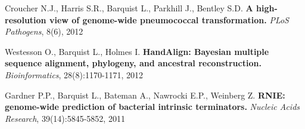 \item{Croucher N.J., Harris S.R., Barquist L., Parkhill J., Bentley S.D. \textbf{A high-resolution view of genome-wide pneumococcal transformation.} \textit{PLoS Pathogens}, 8(6), 2012}

\item{Westesson O., Barquist L., Holmes I. \textbf{HandAlign: Bayesian multiple sequence alignment, phylogeny, and ancestral reconstruction.} \textit{Bioinformatics}, 28(8):1170-1171, 2012}

\item{Gardner P.P., Barquist L., Bateman A., Nawrocki E.P., Weinberg Z. \textbf{RNIE: genome-wide prediction of bacterial intrinsic terminators.} \textit{Nucleic Acids Research}, 39(14):5845-5852, 2011}



 


